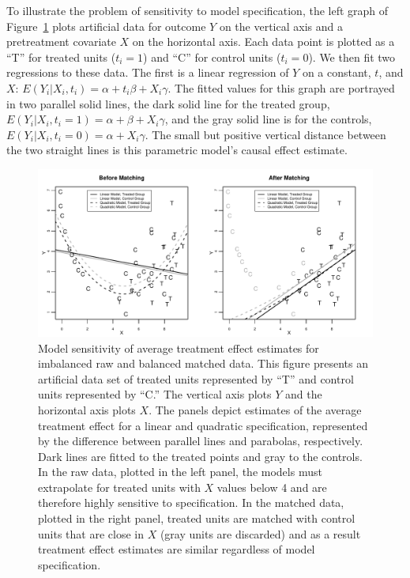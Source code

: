 \documentclass[11pt,titlepage]{article}
\begin{document}
To illustrate the problem of sensitivity to model specification, the
left graph of Figure~\ref{fg:extrap} plots artificial data for outcome
$Y$ on the vertical axis and a pretreatment covariate $X$ on the
horizontal axis.  Each data point is plotted as a ``T'' for treated
units ($t_i=1$) and ``C'' for control units ($t_i=0$).  We then fit
two regressions to these data.  The first is a linear regression of
$Y$ on a constant, $t$, and $X$: $E(Y_i|X_i,t_i)=\alpha + t_i\beta +
X_i\gamma$.  The fitted values for this graph are portrayed in two
parallel solid lines, the dark solid line for the treated group,
$E(Y_i|X_i,t_i=1)=\alpha+\beta+X_i\gamma$, and the gray solid line is
for the controls, $E(Y_i|X_i,t_i=0)=\alpha+X_i\gamma$. The small but
positive vertical distance between the two straight lines is this
parametric model's causal effect estimate.
\begin{figure}[t] 
 \begin{center}
   \includegraphics[width=6in]{figs/olspanel-thick.pdf}
  \end{center}
  \vspace{-0.275in}
  \caption{Model sensitivity of average treatment effect estimates for
    imbalanced raw and balanced matched data.  This figure presents an
    artificial data set of treated units represented by ``T'' and
    control units represented by ``C.'' The vertical axis plots $Y$
    and the horizontal axis plots $X$.  The panels depict estimates of
    the average treatment effect for a linear and quadratic
    specification, represented by the difference between parallel
    lines and parabolas, respectively.  Dark lines are fitted to the
    treated points and gray to the controls.  In the raw data, plotted
    in the left panel, the models must extrapolate for treated units
    with $X$ values below 4 and are therefore highly sensitive to
    specification.  In the matched data, plotted in the right panel,
    treated units are matched with control units that are close in $X$
    (gray units are discarded) and as a result treatment effect
    estimates are similar regardless of model specification.}
  \label{fg:extrap}
\end{figure}
\end{document}
